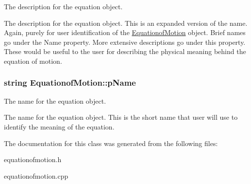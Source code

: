 The description for the equation object. 

The description for the equation object. This is an expanded version of the name. Again, purely for user identification of the \hyperlink{class_equationof_motion}{Equationof\-Motion} object. Brief names go under the Name property. More extensive descriptions go under this property. These would be useful to the user for describing the physical meaning behind the equation of motion. \hypertarget{class_equationof_motion_ad4657581e962d18d09c02734c9568006}{
\subsubsection[{p\-Name}]{\setlength{\rightskip}{0pt plus 5cm}string Equationof\-Motion\-::p\-Name\hspace{0.3cm}{\ttfamily [protected]}}}\label{class_equationof_motion_ad4657581e962d18d09c02734c9568006}


The name for the equation object. 

The name for the equation object. This is the short name that user will use to identify the meaning of the equation. 

The documentation for this class was generated from the following files\-:\begin{DoxyCompactItemize}
\item 
equationofmotion.\-h\item 
equationofmotion.\-cpp\end{DoxyCompactItemize}
